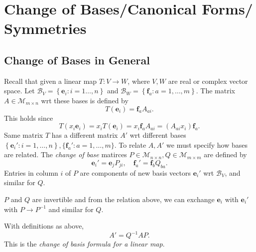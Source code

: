 \documentclass[a4paper]{article}
\begin{document}
    \section{Change of Bases/Canonical Forms/\\Symmetries}
    \subsection{Change of Bases in General}
    Recall that given a linear map $ T: V \to W $, where $V,W$ are
    real or complex vector space. Let $ \mathcal{B}_V=\left\{
    \mathbf{e}_i:i=1\dots,n \right\} $ and $ \mathcal{B}_W=\left\{
    \mathbf{f}_a:a=1,\dots,m \right\} $. The matrix $A\in
    \mathcal{M}_{m\times n}$ wrt these bases is defined by
    \[
      T(\mathbf{e}_i)=\mathbf{f}_a A_{ai}.
    \]
    This holds since
    \[
      T(x_i\mathbf{e}_i)=x_iT(\mathbf{e}_i)=x_i\mathbf{f}_aA_{ai}=(A_{ai}x_i)\mathbf{f}_a.
    \]
    Same matrix $T$ has a different matrix $A'$ wrt different bases $
    \left\{ \mathbf{e}_i':i=1,\dots,n \right\},
    \{\mathbf{f}_a':a=1,\dots,m\} $. To relate $A,A'$ we must specify
    how bases are related. The \textit{change of base} matirces $P\in
    \mathcal{M}_{n\times n}, Q\in \mathcal{M}_{m\times m}$ are defined by
    \[
      \mathbf{e}_i'=\mathbf{e}_jP_{ji}, \quad \mathbf{f}_a'=\mathbf{f}_bQ_{ba}.
    \]
    Entries in column $i$ of $P$ are components of new basis vectors
    $\mathbf{e}_i'$ wrt $\mathcal{B}_V$, and similar for $Q$.
    \begin{remark}
      $P$ and $Q$ are invertible and from the relation above, we can
      exchange $\mathbf{e}_i$ with $\mathbf{e}_i'$ with $ P\to P^{-1}
      $ and similar for $Q$.
    \end{remark}
    \begin{proposition}
      With definitions as above,
      \[
        A'=Q^{-1}AP.
      \]
      This is the \textit{change of basis formula for a linear map}.
    \end{proposition}
\end{document}
